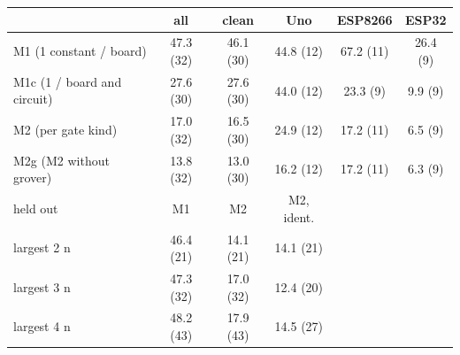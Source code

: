 \begin{tabular}{@{}lccccc@{}}
\toprule
 & all & clean & Uno & ESP8266 & ESP32 \\
\midrule
M1 (1 constant / board) & 47.3 (32) & 46.1 (30) & 44.8 (12) & 67.2 (11) & 26.4 (9) \\
M1c (1 / board and circuit) & 27.6 (30) & 27.6 (30) & 44.0 (12) & 23.3 (9) & 9.9 (9) \\
M2 (per gate kind) & 17.0 (32) & 16.5 (30) & 24.9 (12) & 17.2 (11) & 6.5 (9) \\
M2g (M2 without grover) & 13.8 (32) & 13.0 (30) & 16.2 (12) & 17.2 (11) & 6.3 (9) \\
\midrule
held out & M1 & M2 & M2, ident. & & \\
largest 2 n & 46.4 (21) & 14.1 (21) & 14.1 (21) & & \\
largest 3 n & 47.3 (32) & 17.0 (32) & 12.4 (20) & & \\
largest 4 n & 48.2 (43) & 17.9 (43) & 14.5 (27) & & \\
\bottomrule
\end{tabular}
